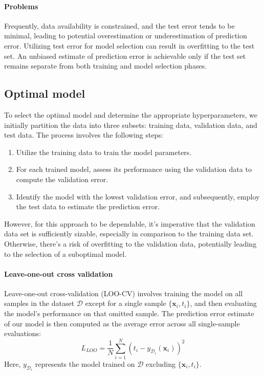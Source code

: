 \paragraph*{Problems}
Frequently, data availability is constrained, and the test error tends to be minimal, leading to potential overestimation or underestimation of prediction error.
Utilizing test error for model selection can result in overfitting to the test set.
An unbiased estimate of prediction error is achievable only if the test set remains separate from both training and model selection phases.

\subsection{Optimal model}
To select the optimal model and determine the appropriate hyperparameters, we initially partition the data into three subsets: training data, validation data, and test data. 
The process involves the following steps:
\begin{enumerate}
    \item Utilize the training data to train the model parameters.
    \item For each trained model, assess its performance using the validation data to compute the validation error.
    \item Identify the model with the lowest validation error, and subsequently, employ the test data to estimate the prediction error.
\end{enumerate}
However, for this approach to be dependable, it's imperative that the validation data set is sufficiently sizable, especially in comparison to the training data set. 
Otherwise, there's a risk of overfitting to the validation data, potentially leading to the selection of a suboptimal model.

\paragraph*{Leave-one-out cross validation}
Leave-one-out cross-validation (LOO-CV) involves training the model on all samples in the dataset $\mathcal{D}$ except for a single sample $\{\textbf{x}_i,t_i\}$, and then evaluating the model's performance on that omitted sample. 
The prediction error estimate of our model is then computed as the average error across all single-sample evaluations:
\[L_{LOO}=\dfrac{1}{N}\sum_{i=1}^{N}{\left( t_i-y_{\mathcal{D}_i}(\textbf{x}_i) \right)}^2\]
Here, $y_{\mathcal{D}_i}$ represents the model trained on $\mathcal{D}$ excluding $\{\textbf{x}_i,t_i\}$. 


